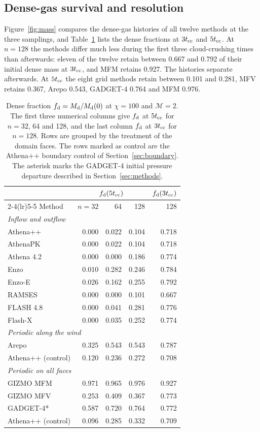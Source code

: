 \documentclass[twocolumn,apj,numberedappendix]{openjournal}
\begin{document}
\subsection{Dense-gas survival and resolution}
Figure~\ref{fig:mass} compares the dense-gas histories of all twelve methods at the three samplings, and Table~\ref{tab:endpoints} lists the dense fractions at $3t_{\rm cc}$ and $5t_{\rm cc}$. At $n=128$ the methods differ much less during the first three cloud-crushing times than afterwards: eleven of the twelve retain between 0.667 and 0.792 of their initial dense mass at $3t_{\rm cc}$, and MFM retains 0.927. The histories separate afterwards. At $5t_{\rm cc}$ the eight grid methods retain between 0.101 and 0.281, MFV retains 0.367, Arepo 0.543, GADGET-4 0.764 and MFM 0.976.
\begin{table}[tb]
\centering
\caption{Dense fraction $f_{\rm d}=M_{\rm d}/M_{\rm d}(0)$ at $\chi=100$ and $\mathcal M=2$. The first three numerical columns give $f_{\rm d}$ at $5t_{\rm cc}$ for $n=32$, 64 and 128, and the last column $f_{\rm d}$ at $3t_{\rm cc}$ for $n=128$. Rows are grouped by the treatment of the domain faces. The rows marked as control are the Athena++ boundary control of Section~\ref{sec:boundary}. The asterisk marks the GADGET-4 initial pressure departure described in Section~\ref{sec:methods}.}
\label{tab:endpoints}
\begin{tabular}{lrrrr}
\toprule
 & \multicolumn{3}{c}{$f_{\rm d}(5t_{\rm cc})$} & $f_{\rm d}(3t_{\rm cc})$\\
\cmidrule(lr){2-4}\cmidrule(lr){5-5}
Method & $n=32$ & 64 & 128 & 128\\
\midrule
\multicolumn{5}{l}{\emph{Inflow and outflow}}\\
Athena++ & 0.000 & 0.022 & 0.104 & 0.718\\
AthenaPK & 0.000 & 0.022 & 0.104 & 0.718\\
Athena 4.2 & 0.000 & 0.000 & 0.186 & 0.774\\
Enzo & 0.010 & 0.282 & 0.246 & 0.784\\
Enzo-E & 0.026 & 0.162 & 0.255 & 0.792\\
RAMSES & 0.000 & 0.000 & 0.101 & 0.667\\
FLASH 4.8 & 0.000 & 0.041 & 0.281 & 0.776\\
Flash-X & 0.000 & 0.035 & 0.252 & 0.774\\
\midrule
\multicolumn{5}{l}{\emph{Periodic along the wind}}\\
Arepo & 0.325 & 0.543 & 0.543 & 0.787\\
Athena++ (control) & 0.120 & 0.236 & 0.272 & 0.708\\
\midrule
\multicolumn{5}{l}{\emph{Periodic on all faces}}\\
GIZMO MFM & 0.971 & 0.965 & 0.976 & 0.927\\
GIZMO MFV & 0.253 & 0.409 & 0.367 & 0.773\\
GADGET-4* & 0.587 & 0.720 & 0.764 & 0.772\\
Athena++ (control) & 0.096 & 0.285 & 0.332 & 0.709\\
\bottomrule
\end{tabular}
\end{table}
\end{document}
